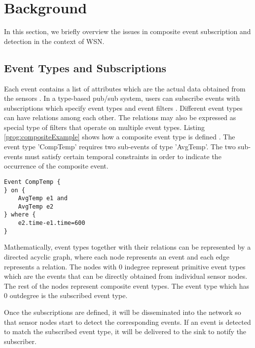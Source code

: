 \section{Background}
\label{sec:background}
In this section, we briefly overview the issues in composite event subscription and detection in the context of WSN.

\subsection{Event Types and Subscriptions}
Each event contains a list of attributes which are the actual data obtained from the sensors \cite{lowlevelnaming}. In a type-based pub/sub system, users can subscribe events with subscriptions which specify event types and event filters \cite{siena}. Different event types can have relations among each other. The relations may also be expressed as special type of filters that operate on multiple event types. Listing \ref{prog:compositeExample} shows how a composite event type is defined \cite{lai:psware}. The event type 'CompTemp' requires two sub-events of type 'AvgTemp'. The two sub-events must satisfy certain temporal constraints in order to indicate the occurrence of the composite event.
\begin{lstlisting}[caption=Example of a composite event, label=prog:compositeExample]
Event CompTemp {
} on {
    AvgTemp e1 and
    AvgTemp e2
} where {
    e2.time-e1.time=600
}
\end{lstlisting}

Mathematically, event types together with their relations can be represented by a directed acyclic graph, where each node represents an event and each edge represents a relation. The nodes with 0 indegree represent primitive event types which are the events that can be directly obtained from individual sensor nodes. The rest of the nodes represent composite event types. The event type which has 0 outdegree is the subscribed event type.

Once the subscriptions are defined, it will be disseminated into the network so that sensor nodes start to detect the corresponding events. If an event is detected to match the subscribed event type, it will be delivered to the sink to notify the subscriber.

